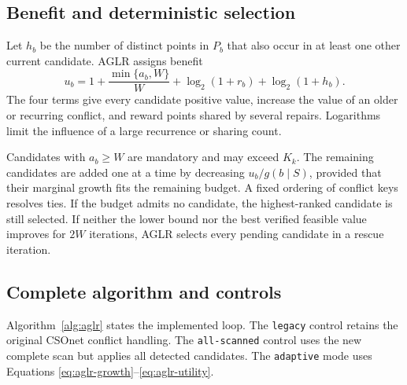 \documentclass[preprint,12pt,authoryear]{elsarticle}
\begin{document}
\subsection{Benefit and deterministic selection}
\label{sec:selection-model}

Let $h_b$ be the number of distinct points in $P_b$ that also occur in at least
one other current candidate. AGLR assigns benefit
\begin{equation}
u_b=1+\frac{\min\{a_b,W\}}{W}
+\log_2(1+r_b)+\log_2(1+h_b).
\label{eq:aglr-utility}
\end{equation}
The four terms give every candidate positive value, increase the value of an
older or recurring conflict, and reward points shared by several repairs.
Logarithms limit the influence of a large recurrence or sharing count.

Candidates with $a_b\ge W$ are mandatory and may exceed $K_k$. The remaining
candidates are added one at a time by decreasing
$u_b/g(b\mid S)$, provided that their marginal growth fits the remaining
budget. A fixed ordering of conflict keys resolves ties. If the budget admits
no candidate, the highest-ranked candidate is still selected. If neither the
lower bound nor the best verified feasible value improves for $2W$ iterations,
AGLR selects every pending candidate in a rescue iteration.

\subsection{Complete algorithm and controls}

Algorithm~\ref{alg:aglr} states the implemented loop. The \texttt{legacy}
control retains the original CSOnet conflict handling. The
\texttt{all-scanned} control uses the new complete scan but applies all detected
candidates. The \texttt{adaptive} mode uses Equations
\eqref{eq:aglr-growth}--\eqref{eq:aglr-utility}.
\end{document}
